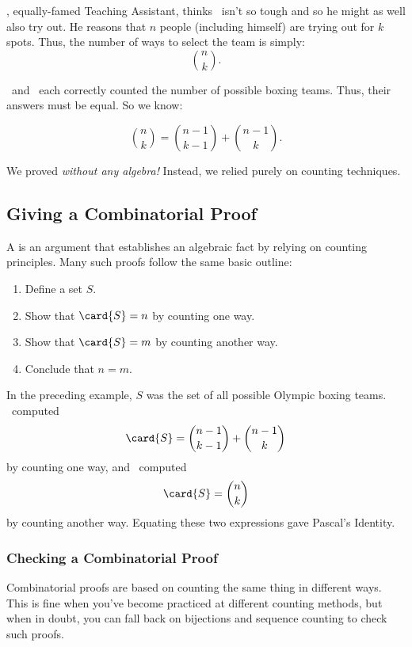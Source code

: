 \Jer, equally-famed Teaching Assistant, thinks \Jay\ isn't so tough
and so he might as well also try out.  He reasons that $n$ people
(including himself) are trying out for $k$ spots.  Thus, the number of
ways to select the team is simply:
%
\[
    \binom{n}{k}.
\]

\Jer\ and \Jay\ each correctly counted the number of possible boxing
teams.  Thus, their answers must be equal.  So we know:
%
\begin{lemma}
\begin{equation}\label{pascal-ident}
    \binom{n}{k} = \binom{n-1}{k-1} + \binom{n - 1}{k}.
\end{equation}
\end{lemma}
We proved  \emph{without any
  algebra!}  Instead, we relied purely on counting techniques.

\subsection{Giving a Combinatorial Proof}

A  is an argument that establishes an
algebraic fact by relying on counting principles.  Many such proofs
follow the same basic outline:
%
\begin{enumerate}

\item Define a set $S$.

\item Show that $\card{S} = n$ by counting one way.

\item Show that $\card{S} = m$ by counting another way.

\item Conclude that $n = m$.

\end{enumerate}
%
In the preceding example, $S$ was the set of all possible Olympic boxing
teams.  \Jay\ computed
\[
\card{S} = \binom{n-1}{k-1} + \binom{n-1}{k}
\]
by counting one way, and \Jer\ computed
\[
\card{S} = \binom{n}{k}
\]
by counting another way.  Equating these two expressions gave Pascal's
Identity.

\subsubsection{Checking a Combinatorial Proof}

Combinatorial proofs are based on counting the same thing in different
ways.  This is fine when you've become practiced at different counting
methods, but when in doubt, you can fall back on bijections and
sequence counting to check such proofs.

